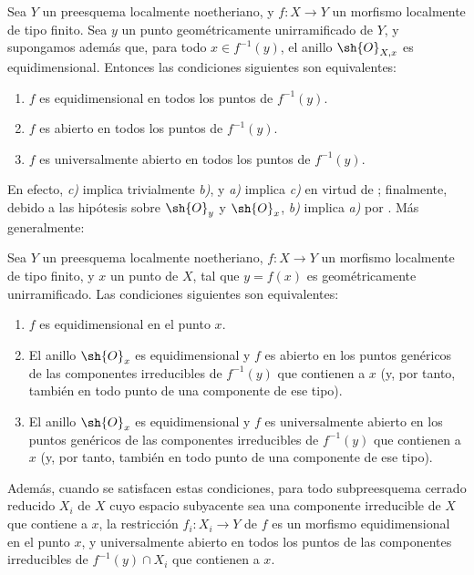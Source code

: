 \begin{corollary}[14.4.6]
\label{IV.14.4.6}
Sea $Y$ un preesquema localmente noetheriano, y $f:X\to Y$ un morfismo localmente de tipo finito.
Sea $y$ un punto geométricamente unirramificado de $Y$, y supongamos además que, para todo $x\in f^{-1}(y)$, el anillo $\sh{O}_{X,x}$ es equidimensional.
Entonces las condiciones siguientes son equivalentes:
\begin{enumerate}[label=\emph{\alph*)}]
  \item $f$ es equidimensional  en todos los puntos de $f^{-1}(y)$.
  \item $f$ es abierto en todos los puntos de $f^{-1}(y)$.
  \item $f$ es universalmente abierto en todos los puntos de $f^{-1}(y)$.
\end{enumerate}
\end{corollary}

En efecto, \emph{c)} implica trivialmente \emph{b)}, y \emph{a)} implica \emph{c)} en virtud de ; finalmente, debido a las hipótesis sobre $\sh{O}_y$ y $\sh{O}_x$, \emph{b)} implica \emph{a)} por .
Más generalmente:

\begin{proposition}[14.4.7]
\label{IV.14.4.7}
Sea $Y$ un preesquema localmente noetheriano, $f:X\to Y$ un morfismo localmente de tipo finito, y $x$ un punto de $X$, tal que $y=f(x)$ es geométricamente unirramificado.
Las condiciones siguientes son equivalentes:
\begin{enumerate}[label=\emph{\alph*)}]
  \item $f$ es equidimensional  en el punto $x$.
  \item El anillo $\sh{O}_x$ es equidimensional y $f$ es abierto en los puntos genéricos de las componentes irreducibles de $f^{-1}(y)$ que contienen a $x$ (y, por tanto, también en todo punto de una componente de ese tipo).
  \item El anillo $\sh{O}_x$ es equidimensional y $f$ es universalmente abierto en los puntos genéricos de las componentes irreducibles de $f^{-1}(y)$ que contienen a $x$ (y, por tanto, también en todo punto de una componente de ese tipo).
\end{enumerate}
Además, cuando se satisfacen estas condiciones, para todo subpreesquema cerrado reducido $X_i$ de $X$ cuyo espacio subyacente sea una componente irreducible de $X$ que contiene a $x$, la restricción $f_i:X_i\to Y$ de $f$ es un morfismo equidimensional en el punto $x$, y universalmente abierto en todos los puntos de las componentes irreducibles de $f^{-1}(y)\cap X_i$ que contienen a $x$.
\end{proposition}

